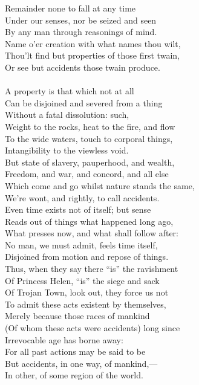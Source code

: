 Remainder none to fall at any time\\
Under our senses, nor be seized and seen\\
By any man through reasonings of mind.\\
Name o'er creation with what names thou wilt,\\
Thou'lt find but properties of those first twain,\\
Or see but accidents those twain produce.\\
\\
A property is that which not at all\\
Can be disjoined and severed from a thing\\
Without a fatal dissolution: such,\\
Weight to the rocks, heat to the fire, and flow\\
To the wide waters, touch to corporal things,\\
Intangibility to the viewless void.\\
But state of slavery, pauperhood, and wealth,\\
Freedom, and war, and concord, and all else\\
Which come and go whilst nature stands the same,\\
We're wont, and rightly, to call accidents.\\
Even time exists not of itself; but sense\\
Reads out of things what happened long ago,\\
What presses now, and what shall follow after:\\
No man, we must admit, feels time itself,\\
Disjoined from motion and repose of things.\\
Thus, when they say there ``is'' the ravishment\\
Of Princess Helen, ``is'' the siege and sack\\
Of Trojan Town, look out, they force us not\\
To admit these acts existent by themselves,\\
Merely because those races of mankind\\
(Of whom these acts were accidents) long since\\
Irrevocable age has borne away:\\
For all past actions may be said to be\\
But accidents, in one way, of mankind,—\\
In other, of some region of the world.\\
